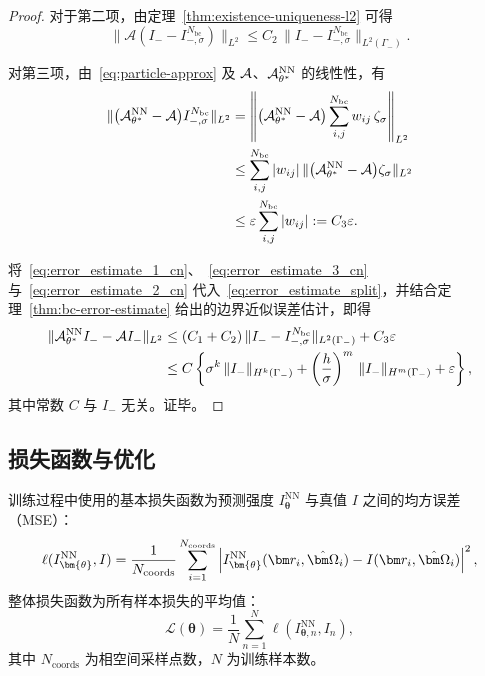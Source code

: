 \begin{proof}
    对于第二项，由定理~\ref{thm:existence-uniqueness-l2} 可得
    \begin{equation}\label{eq:error_estimate_3_cn}
        \|\mathcal{A} (I_- - I^{N_{\text{bc}}}_{-,\sigma})\|_{L^2} \leq C_2 \,\|I_- - I^{N_{\text{bc}}}_{-,\sigma}\|_{L^2(\Gamma_-)}.
    \end{equation}

    对第三项，由~\eqref{eq:particle-approx} 及 $\mathcal{A}$、$\mathcal{A}^{\text{NN}}_{\theta^*}$ 的线性性，有
    \begin{equation}\label{eq:error_estimate_2_cn}
        \begin{aligned}
            \|\big(\mathcal{A}^{\text{NN}}_{\theta^*} - \mathcal{A}\big) I^{N_{\text{bc}}}_{-,\sigma}\|_{L^2}
             & = \left\|\big(\mathcal{A}^{\text{NN}}_{\theta^*} - \mathcal{A}\big) \sum_{i,j}^{N_{\text{bc}}} w_{ij}\,\zeta_\sigma\right\|_{L^2} \\
             & \leq \sum_{i,j}^{N_{\text{bc}}} |w_{ij}|\, \|\big(\mathcal{A}^{\text{NN}}_{\theta^*} - \mathcal{A}\big) \zeta_\sigma\|_{L^2}      \\
             & \leq \varepsilon \sum_{i,j}^{N_{\text{bc}}} |w_{ij}| := C_3\varepsilon.
        \end{aligned}
    \end{equation}

    将~\eqref{eq:error_estimate_1_cn}、~\eqref{eq:error_estimate_3_cn} 与~\eqref{eq:error_estimate_2_cn} 代入~\eqref{eq:error_estimate_split}，并结合定理~\ref{thm:bc-error-estimate} 给出的边界近似误差估计，即得
    \begin{equation}
        \begin{aligned}
            \|\mathcal{A}^{\text{NN}}_{\theta^*} I_- - \mathcal{A} I_-\|_{L^2}
             & \leq (C_1 + C_2)\, \|I_- - I^{N_{\text{bc}}}_{-,\sigma}\|_{L^2(\Gamma_-)} + C_3\varepsilon                                          \\
             & \leq C\left\{ \sigma^k \,\|I_-\|_{H^k(\Gamma_-)} + \left(\frac{h}{\sigma}\right)^m \,\|I_-\|_{H^m(\Gamma_-)} + \varepsilon\right\},
        \end{aligned}
    \end{equation}
    其中常数 $C$ 与 $I_-$ 无关。证毕。
\end{proof}

\subsection{损失函数与优化}

训练过程中使用的基本损失函数为预测强度 $I^{\text{NN}}_{\bm{\theta}}$ 与真值 $I$ 之间的均方误差（MSE）：
\begin{equation}\label{eq:mse}
    \ell(I^\text{NN}_{\bm{\theta}}, I)= \frac{1}{N_\text{coords}}\sum_{i=1}^{N_{\text{coords}}} \left| I^{\text{NN}}_{\bm{\theta}}(\br_i,\bOmega_i) - I(\br_i, \bOmega_i) \right|^2,
\end{equation}
整体损失函数为所有样本损失的平均值：
\begin{equation}\label{eq:loss}
    \mathcal{L}(\bm{\theta}) = \frac{1}{N}\sum_{n=1}^N \ell(I^\text{NN}_{\bm{\theta},n}, I_n),
\end{equation}
其中 $N_{\text{coords}}$ 为相空间采样点数，$N$ 为训练样本数。

